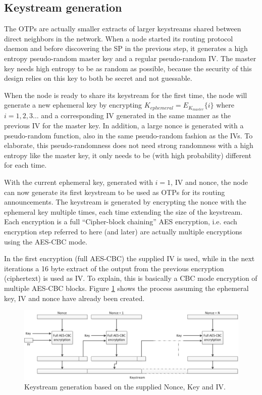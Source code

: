 \subsection{Keystream generation}
The \acp{OTP} are actually smaller extracts of larger keystreams shared
between direct neighbors in the network. When a node started its routing
protocol daemon and before discovering the \ac{SP} in the previous step, it
generates a high entropy pseudo-random master key and a regular pseudo-random
\ac{IV}. The master key needs high entropy to be as random as possible, because
the security of this design relies on this key to both be secret and not
guessable.

When the node is ready to share its keystream for the first time, the node will
generate a new ephemeral key by encrypting $K_{ephemeral} =
E_{K_{master}}\{i\}$ where $i = 1,2,3\ldots$ and a corresponding \ac{IV}
generated in the same manner as the previous \ac{IV} for the master key. In
addition, a large nonce is generated with a pseudo-random function, also in the
same pseudo-random fashion as the \acp{IV}. To elaborate, this pseudo-randomness
does not need strong randomness with a high entropy like the master key, it only
needs to be (with high probability) different for each time.

With the current ephemeral key, generated with $i = 1$, \ac{IV} and nonce, the
node can now generate its first keystream to be used as \acp{OTP} for its
routing announcements. The keystream is generated by encrypting the nonce with
the ephemeral key multiple times, each time extending the size of the
keystream. Each encryption is a full ``Cipher-block chaining'' AES encryption,
i.e. each encryption step referred to here (and later) are actually multiple
encryptions using the AES-CBC mode.

In the first encryption (full AES-CBC) the supplied \ac{IV} is used, while in
the next iterations a 16 byte extract of the output from the previous encryption
(ciphertext) is used as \ac{IV}. To explain, this is basically a \ac{CBC} mode
encryption of multiple AES-CBC blocks. Figure \ref{fig:keystream_generation}
shows the process assuming the ephemeral key, IV and nonce have already been
created.

\begin{figure}[h]
	\centering
  	\includegraphics[width=\textwidth]{images/keystream_generation.png}
  	\caption{Keystream generation based on the supplied Nonce, Key and IV.}
	\label{fig:keystream_generation}
\end{figure}

